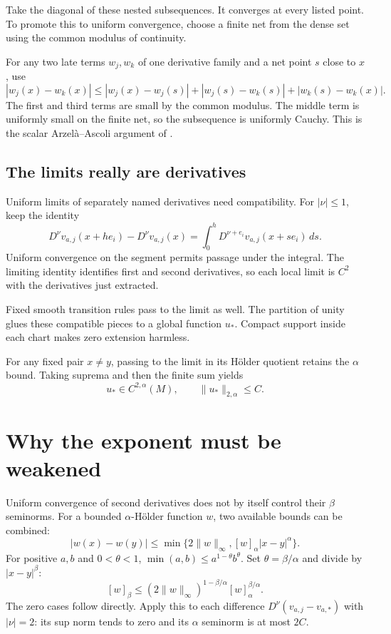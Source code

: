 \documentclass[12pt,reqno]{amsart}
\begin{document}
Take the diagonal of these nested subsequences. It converges at every
listed point. To promote this to uniform convergence, choose a finite
net from the dense set using the common modulus of continuity.

For any two late terms $w_j,w_k$ of one derivative family and a net
point $s$ close to $x$, use
\[
 |w_j(x)-w_k(x)|\leq
 |w_j(x)-w_j(s)|+|w_j(s)-w_k(s)|+|w_k(s)-w_k(x)|.
\]
The first and third terms are small by the common modulus. The middle
term is uniformly small on the finite net, so the subsequence is uniformly
Cauchy. This is the scalar Arzel\`a--Ascoli argument of \cite{S-Shapiro}.

\subsection*{The limits really are derivatives}
Uniform limits of separately named derivatives need compatibility.
For $|\nu|\leq1$, keep the identity
\[
 D^\nu v_{a,j}(x+he_i)-D^\nu v_{a,j}(x)
 =\int_0^h D^{\nu+e_i}v_{a,j}(x+se_i)\,ds.
\]
Uniform convergence on the segment permits passage under the integral.
The limiting identity identifies first and second derivatives, so each
local limit is $C^2$ with the derivatives just extracted.

Fixed smooth transition rules pass to the limit as well. The partition
of unity glues these compatible pieces to a global function $u_*$.
Compact support inside each chart makes zero extension harmless.

For any fixed pair $x\ne y$, passing to the limit in its H\"older quotient
retains the $\alpha$ bound. Taking suprema and then the finite sum yields
\[
 u_*\in C^{2,\alpha}(M),\qquad \|u_*\|_{2,\alpha}\leq C.
\]

\section{Why the exponent must be weakened}
Uniform convergence of second derivatives does not by itself control
their $\beta$ seminorms. For a bounded $\alpha$-H\"older function $w$,
two available bounds can be combined:
\[
 |w(x)-w(y)|\leq
 \min\{2\|w\|_\infty,[w]_\alpha|x-y|^\alpha\}.
\]
For positive $a,b$ and $0<\theta<1$, $\min(a,b)\leq a^{1-\theta}b^\theta$.
Set $\theta=\beta/\alpha$ and divide by $|x-y|^\beta$:
\begin{equation}\label{eq:interpolation}
 [w]_\beta\leq(2\|w\|_\infty)^{1-\beta/\alpha}
                  [w]_\alpha^{\beta/\alpha}.
\end{equation}
The zero cases follow directly. Apply this to each difference
$D^\nu(v_{a,j}-v_{a,*})$ with $|\nu|=2$: its sup norm tends to zero
and its $\alpha$ seminorm is at most $2C$.
\end{document}
